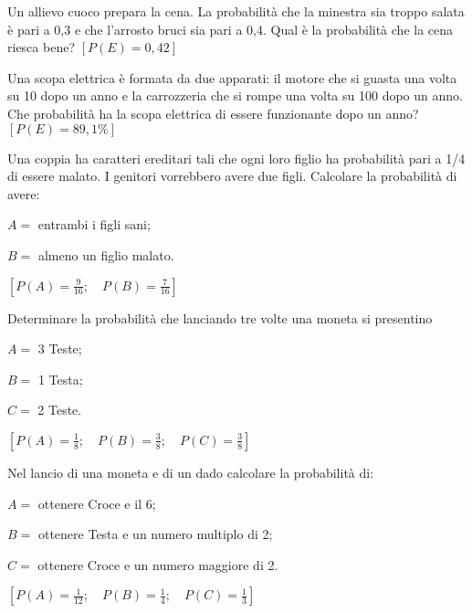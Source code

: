 \begin{esercizio}[\Ast]
 \label{ese:9.53}
Un allievo cuoco prepara la cena. La probabilità che la minestra sia troppo 
salata è pari a 0,3 e che l'arrosto bruci sia pari a 0,4. Qual è la probabilità 
che la cena riesca bene?
\hfill \(\left[P(E)=0,42\right]\)
\end{esercizio}

\begin{esercizio}[\Ast]
 \label{ese:9.54}
Una scopa elettrica è formata da due apparati: il motore che si guasta una volta 
su 10 dopo un anno e la carrozzeria che si rompe una volta su 100 dopo un anno. 
Che probabilità ha la scopa elettrica di essere funzionante dopo un anno?
\hfill \(\left[P(E)=89,1\%\right]\)
\end{esercizio}

\begin{esercizio}[\Ast]
 \label{ese:9.55}
Una coppia ha caratteri ereditari tali che ogni loro figlio ha probabilità pari 
a 1/4 di essere malato. I genitori vorrebbero avere due figli. Calcolare la 
probabilità di avere:
\begin{itemize*}
\item \( A= \) entrambi i figli sani;
\item \( B= \) almeno un figlio malato.
\end{itemize*}
\hfill \(\left[P(A)=\frac 9 {16}; \quad P(B)=\frac 7 {16}\right]\)
\end{esercizio}

\begin{esercizio}[\Ast]
 \label{ese:9.56}
Determinare la probabilità che lanciando tre volte una moneta si presentino
\begin{itemize*}
\item \( A= \) 3 Teste;
\item \( B= \) 1 Testa;
\item \( C= \) 2 Teste.
\end{itemize*}
\hfill \(\left[P(A)=\frac 1 8; \quad P(B)=\frac3 8; \quad P(C)=\frac 3 8\right]\)
\end{esercizio}

\begin{esercizio}[\Ast]
 \label{ese:9.57}
Nel lancio di una moneta e di un dado calcolare la probabilità di:
\begin{itemize*}
\item \( A= \) ottenere Croce e il 6;
\item \( B= \) ottenere Testa e un numero multiplo di 2;
\item \( C= \) ottenere Croce e un numero maggiore di 2.
\end{itemize*}
\hfill \(\left[P(A)=\frac 1 {12}; \quad P(B)=\frac1 4; \quad 
P(C)=\frac 1 3\right]\)
\end{esercizio}

